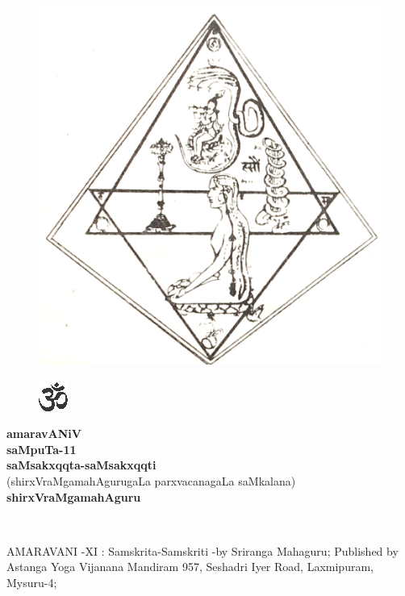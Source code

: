 \begin{figure}[h]
\centering
{\includegraphics[scale=.18]{0000b.eps}}
\end{figure}

\begin{figure}[h]
\centering
{\includegraphics[scale=1]{om1.eps}}
\end{figure}

\bigskip
\begin{center}
{\Huge\bf amaravANiV}\\[15pt]
{\Large\bf saMpuTa-11}\\[15pt]
{\Huge\bf saMsakxqqta-saMsakxqqti}\\[15pt]
{(shirxVraMgamahAgurugaLa parxvacanagaLa saMkalana)}\\[25pt]
{\Huge\bf shirxVraMgamahAguru}
\end{center}


\vfill
\eject

\thispagestyle{empty}
~\phantom{a}

{\rm AMARAVANI -XI : Samskrita-Samskriti -by Sriranga Mahaguru; Publis\-hed by Astanga Yoga Vijanana Mandiram 957, Seshadri Iyer Road, Laxmi\-puram, Mysuru-4;}

